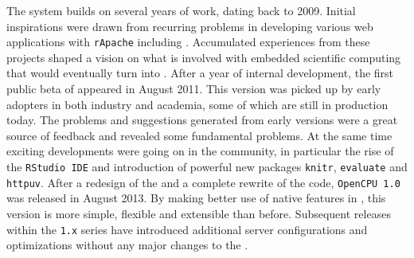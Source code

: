 The \OpenCPU system builds on several years of work, dating back to 2009. Initial inspirations were drawn from recurring problems in developing various \R web applications with \texttt{rApache} including \cite{van2009stage}. Accumulated experiences from these projects shaped a vision on what is involved with embedded scientific computing that would eventually turn into \OpenCPU. After a year of internal development, the first public beta of \OpenCPU appeared in August 2011. This version was picked up by early adopters in both industry and academia, some of which are still in production today. The problems and suggestions generated from early versions were a great source of feedback and revealed some fundamental problems. At the same time exciting developments were going on in the \R community, in particular the rise of the \texttt{RStudio IDE} and introduction of powerful new \R packages \texttt{knitr}, \texttt{evaluate} and \texttt{httpuv}. After a redesign of the \API and a complete rewrite of the code, \texttt{OpenCPU 1.0} was released in August 2013. By making better use of native features in \HTTP, this version is more simple, flexible and extensible than before. Subsequent releases within the \texttt{1.x} series have introduced additional server configurations and optimizations without any major changes to the \API.


